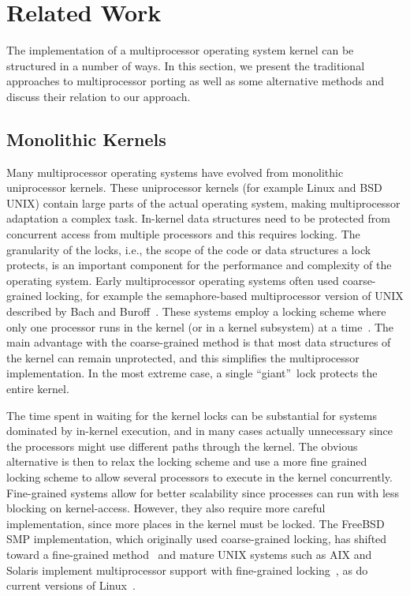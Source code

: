 \section{Related Work}
\label{sec:appkern:related_work}
The implementation of a multiprocessor operating system kernel can be
structured in a number of ways.  In this section, we present the traditional
approaches to multiprocessor porting as well as some alternative methods and discuss
their relation to our approach.

\subsection{Monolithic Kernels}
Many multiprocessor operating systems have evolved from monolithic
uniprocessor kernels. These uniprocessor kernels (for example Linux and BSD
UNIX) contain large parts of the actual operating system, making
multiprocessor adaptation a complex task.  In-kernel data structures need to
be protected from concurrent access from multiple processors and this requires
locking. The granularity of the locks, i.e., the scope of the code or data
structures a lock protects, is an important component for the performance and
complexity of the operating system. Early multiprocessor operating systems
often used coarse-grained locking, for example the semaphore-based
multiprocessor version of UNIX described by Bach and
Buroff~\cite{bach84multiprocessor}\label{fix:bach}. These systems employ a
locking scheme where only one processor runs in the kernel (or in a kernel
subsystem) at a time~\cite{schimmel94unix}.  The main advantage with the
coarse-grained method is that most data structures of the kernel can remain
unprotected, and this simplifies the multiprocessor implementation. In the
most extreme case, a single ``giant''~lock protects the entire kernel.

The time spent in waiting for the kernel locks can be substantial for systems
dominated by in-kernel execution, and in many cases actually unnecessary since
the processors might use different paths through the kernel. The obvious
alternative is then to relax the locking scheme and use a more fine grained
locking scheme to allow several processors to execute in the kernel
concurrently.  Fine-grained systems allow for better scalability since
processes can run with less blocking on kernel-access.  However, they also
require more careful implementation, since more places in the kernel must be
locked.  The FreeBSD SMP implementation, which originally used coarse-grained
locking, has shifted toward a fine-grained method~\cite{lehey01freebsd} and
mature UNIX systems such as AIX and Solaris implement multiprocessor support
with fine-grained locking~\cite{clark95symmetric, kleinman92solaris}, as do
current versions of Linux~\cite{love2003linux}.


